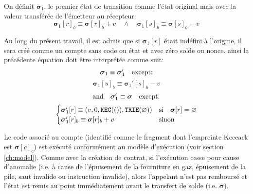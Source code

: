 \documentclass[9pt,oneside]{amsart}
\begin{document}
\begin{multicols}{2}
On définit $\boldsymbol{\sigma}_1$, le premier état de transition comme l'état original mais avec la valeur transférée de l'émetteur au récepteur:
\begin{equation}
\boldsymbol{\sigma}_1[r]_b \equiv \boldsymbol{\sigma}[r]_b + v \quad\wedge\quad \boldsymbol{\sigma}_1[s]_b \equiv \boldsymbol{\sigma}[s]_b - v
\end{equation}

Au long du présent travail, il est admis que si $\boldsymbol{\sigma}_1[r]$ était indéfini à l'origine, il sera créé comme un compte sans code ou état et avec zéro solde ou nonce. ainsi la précédente équation doit être interprétée comme suit:
\begin{equation}
\boldsymbol{\sigma}_1 \equiv \boldsymbol{\sigma}_1' \quad \text{except:} \\
\end{equation}
\begin{equation}
\boldsymbol{\sigma}_1[s]_b \equiv \boldsymbol{\sigma}_1'[s]_b - v
\end{equation}
\begin{equation}
\text{and}\quad \boldsymbol{\sigma}_1' \equiv \boldsymbol{\sigma} \quad \text{except:} \\
\end{equation}
\begin{equation}
\begin{cases}
\boldsymbol{\sigma}_1'[r] \equiv (v, 0, \mathtt{\tiny KEC}(()), \mathtt{\tiny TRIE}(\varnothing)) & \text{si} \quad \boldsymbol{\sigma}[r] = \varnothing \\
\boldsymbol{\sigma}_1'[r]_b \equiv \boldsymbol{\sigma}[r]_b + v & \text{sinon}
\end{cases}
\end{equation}

Le code associé au compte (identifié comme le fragment dont l'empreinte Keccack est $\boldsymbol{\sigma}[c]_c$) est exécuté conformément au modèle d'exécution (voir section \ref{ch:model}). Comme avec la création de contrat, si l'exécution cesse pour cause d'anomalie (i.e. à cause de l'épuisement de la fourniture en gaz, épuisement de la pile, saut invalide ou instruction invalide), alors l'appelant n'est pas remboursé et l'état est remis au point immédiatement avant le transfert de solde (i.e. $\boldsymbol{\sigma}$).


\end{multicols}
\end{document}
